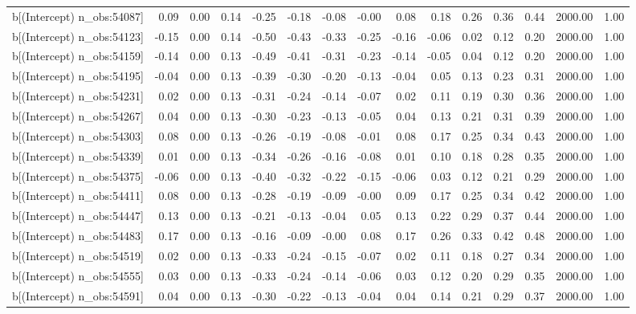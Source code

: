 \begin{table}[ht]
\begin{tabular}{rrrrrrrrrrrrrrr}
  b[(Intercept) n\_obs:54087] & 0.09 & 0.00 & 0.14 & -0.25 & -0.18 & -0.08 & -0.00 & 0.08 & 0.18 & 0.26 & 0.36 & 0.44 & 2000.00 & 1.00 \\ 
  b[(Intercept) n\_obs:54123] & -0.15 & 0.00 & 0.14 & -0.50 & -0.43 & -0.33 & -0.25 & -0.16 & -0.06 & 0.02 & 0.12 & 0.20 & 2000.00 & 1.00 \\ 
  b[(Intercept) n\_obs:54159] & -0.14 & 0.00 & 0.13 & -0.49 & -0.41 & -0.31 & -0.23 & -0.14 & -0.05 & 0.04 & 0.12 & 0.20 & 2000.00 & 1.00 \\ 
  b[(Intercept) n\_obs:54195] & -0.04 & 0.00 & 0.13 & -0.39 & -0.30 & -0.20 & -0.13 & -0.04 & 0.05 & 0.13 & 0.23 & 0.31 & 2000.00 & 1.00 \\ 
  b[(Intercept) n\_obs:54231] & 0.02 & 0.00 & 0.13 & -0.31 & -0.24 & -0.14 & -0.07 & 0.02 & 0.11 & 0.19 & 0.30 & 0.36 & 2000.00 & 1.00 \\ 
  b[(Intercept) n\_obs:54267] & 0.04 & 0.00 & 0.13 & -0.30 & -0.23 & -0.13 & -0.05 & 0.04 & 0.13 & 0.21 & 0.31 & 0.39 & 2000.00 & 1.00 \\ 
  b[(Intercept) n\_obs:54303] & 0.08 & 0.00 & 0.13 & -0.26 & -0.19 & -0.08 & -0.01 & 0.08 & 0.17 & 0.25 & 0.34 & 0.43 & 2000.00 & 1.00 \\ 
  b[(Intercept) n\_obs:54339] & 0.01 & 0.00 & 0.13 & -0.34 & -0.26 & -0.16 & -0.08 & 0.01 & 0.10 & 0.18 & 0.28 & 0.35 & 2000.00 & 1.00 \\ 
  b[(Intercept) n\_obs:54375] & -0.06 & 0.00 & 0.13 & -0.40 & -0.32 & -0.22 & -0.15 & -0.06 & 0.03 & 0.12 & 0.21 & 0.29 & 2000.00 & 1.00 \\ 
  b[(Intercept) n\_obs:54411] & 0.08 & 0.00 & 0.13 & -0.28 & -0.19 & -0.09 & -0.00 & 0.09 & 0.17 & 0.25 & 0.34 & 0.42 & 2000.00 & 1.00 \\ 
  b[(Intercept) n\_obs:54447] & 0.13 & 0.00 & 0.13 & -0.21 & -0.13 & -0.04 & 0.05 & 0.13 & 0.22 & 0.29 & 0.37 & 0.44 & 2000.00 & 1.00 \\ 
  b[(Intercept) n\_obs:54483] & 0.17 & 0.00 & 0.13 & -0.16 & -0.09 & -0.00 & 0.08 & 0.17 & 0.26 & 0.33 & 0.42 & 0.48 & 2000.00 & 1.00 \\ 
  b[(Intercept) n\_obs:54519] & 0.02 & 0.00 & 0.13 & -0.33 & -0.24 & -0.15 & -0.07 & 0.02 & 0.11 & 0.18 & 0.27 & 0.34 & 2000.00 & 1.00 \\ 
  b[(Intercept) n\_obs:54555] & 0.03 & 0.00 & 0.13 & -0.33 & -0.24 & -0.14 & -0.06 & 0.03 & 0.12 & 0.20 & 0.29 & 0.35 & 2000.00 & 1.00 \\ 
  b[(Intercept) n\_obs:54591] & 0.04 & 0.00 & 0.13 & -0.30 & -0.22 & -0.13 & -0.04 & 0.04 & 0.14 & 0.21 & 0.29 & 0.37 & 2000.00 & 1.00 \\ 

\end{tabular}
\end{table}
